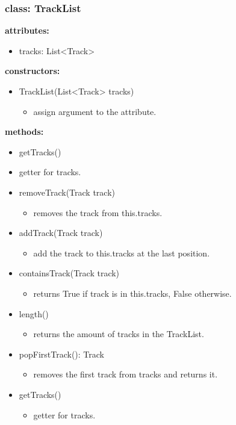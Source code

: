 \documentclass[oneside, ngerman]{sdqtechreport}
\begin{document}
\subsubsection{class: TrackList}
\textbf{attributes:}
\begin{itemize}
    \item tracks: List<Track>
\end{itemize}

\textbf{constructors:}
\begin{itemize}
    \item TrackList(List<Track> tracks) 
    \begin{itemize}
        \item assign argument to the attribute.
    \end{itemize}
\end{itemize}

\textbf{methods:}
\begin{itemize}
    \item getTracks()
\end{itemize}
    \begin{itemize}
        \item getter for tracks.
    \end{itemize}
    \begin{itemize}
    \item removeTrack(Track track)
    \begin{itemize}
        \item removes the track from this.tracks.
    \end{itemize}
    \item addTrack(Track track)
    \begin{itemize}
        \item add the track to this.tracks at the last position.
    \end{itemize}
    \item containsTrack(Track track)
    \begin{itemize}
        \item returns True if track is in this.tracks, False otherwise.
    \end{itemize}
    
    \item length()
    \begin{itemize}
        \item returns the amount of tracks in the TrackList.
    \end{itemize}
    \item popFirstTrack(): Track
    \begin{itemize}
        \item removes the first track from tracks and returns it. 
    \end{itemize}
    \item getTracks()
    \begin{itemize}
        \item getter for tracks.
    \end{itemize}
    
\end{itemize}
\end{document}
